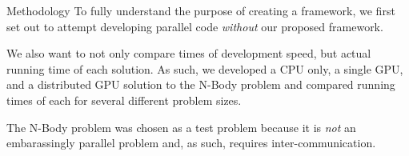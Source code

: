 \begin{block}{\Large Methodology}
To fully understand the purpose of creating a framework, we first set out to
attempt developing parallel code \emph{without} our proposed framework.

We also want to not only compare times of development speed, but actual running
time of each solution. As such, we developed a CPU only, a single GPU, and a
distributed GPU solution to the N-Body problem and compared running times of
each for several different problem sizes.\hfill{}\\{}

The N-Body problem was chosen as a test problem because it is \emph{not}
an embarassingly parallel problem and, as such, requires inter-communication.
\end{block}

